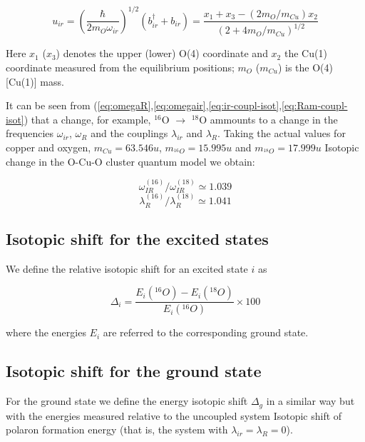 \begin{equation}\label{eq:ir-coord}
u_{ir} = \left(\frac{\hbar}{2m_O \omega_{ir}}\right)^{1/2}(b_{ir}^\dagger + b_{ir}) = \frac{x_1 + x_3 - (2m_O/m_{Cu})x_2}{(2 + 4m_O/m_{Cu})^{1/2}}
\end{equation}

Here $x_1$ ($x_3$) denotes the upper (lower) O(4) coordinate and $x_2$  the Cu(1) coordinate measured from the equilibrium positions;   $m_O$ ($m_{Cu}$) is the O(4) [Cu(1)] mass.

It can be seen from (\ref{eq:omegaR},\ref{eq:omegair},\ref{eq:ir-coupl-isot},\ref{eq:Ram-coupl-isot}) that a change, for example, $^{16}$O $\rightarrow$ $^{18}$O ammounts to a change in the frequencies  $\omega_{ir}$, $\omega_R$ and the couplings $\lambda_{ir}$ and $\lambda_R$. Taking the actual values for copper and oxygen, $m_{Cu}=63.546u$, $m_{^{16}O}=15.995u$ and $m_{^{18}O}=17.999u$ Isotopic change in the O-Cu-O cluster quantum model we obtain:

\begin{equation}\label{eq:omega-ir-isot}
\omega^{(16)}_{IR} / \omega^{(18)}_{IR} \simeq 1.039
\end{equation}
\begin{equation}\label{eq:lambda-ir-isot}
\lambda_R^{(16)} / \lambda_R^{(18)} \simeq 1.041
\end{equation}


\subsection{Isotopic shift for the excited states}

We define the relative isotopic shift for an excited state $i$ as 

\begin{equation}\label{eq:isot-shift-def-exc}
\Delta_i = \frac{E_i(^{16}O)- E_i(^{18}O)}{E_i(^{16}O)} \times 100
\end{equation}

where the energies $E_i$ are referred to the corresponding ground state.

\subsection{Isotopic shift for the ground state}

For the ground state we define the energy isotopic shift $\Delta_g$ in a similar way but with the energies measured relative to the uncoupled system Isotopic shift of polaron formation energy (that is, the system with $\lambda_{ir}=\lambda_R=0$).

